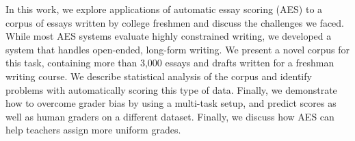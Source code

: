 In this work, we explore applications of automatic essay scoring (AES) to a corpus of essays written by college freshmen and discuss the challenges we faced. While most AES systems evaluate highly constrained writing, we developed a system that handles open-ended, long-form writing.  We present a novel corpus for this task, containing more than 3,000 essays and drafts written for a freshman writing course. We describe statistical analysis of the corpus and identify problems with automatically scoring this type of data. Finally, we demonstrate how to overcome grader bias by using a multi-task setup, and predict scores as well as human graders on a different dataset. Finally, we discuss how AES can help teachers assign more uniform grades.
